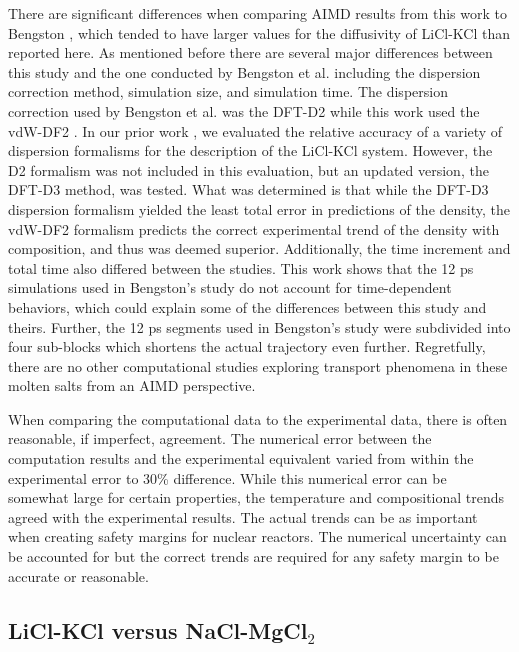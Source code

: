 \documentclass[review]{elsarticle}
\begin{document}
There are significant differences when comparing AIMD results from this work to Bengston \cite{Bengston2014}, which tended to have larger values for the diffusivity of LiCl-KCl than reported here. As mentioned before there are several major differences between this study and the one conducted by Bengston et al. \cite{Bengston2014} including the dispersion correction method, simulation size, and simulation time. The dispersion correction used by Bengston et al. was the DFT-D2\cite{grimme} while this work used the vdW-DF2 \cite{Dion2004}. In our prior work \cite{duemmler_liclkcl}, we evaluated the relative accuracy of a variety of dispersion formalisms for the description of the LiCl-KCl system. However, the D2 formalism was not included in this evaluation, but an updated version, the DFT-D3 method, was tested. What was determined is that while the DFT-D3 dispersion formalism yielded the least total error in predictions of the density, the vdW-DF2 formalism predicts the correct experimental trend of the density with composition, and thus was deemed superior. Additionally, the time increment and total time also differed between the studies. This work shows that the 12 ps simulations used in Bengston's study do not account for time-dependent behaviors, which could explain some of the differences between this study and theirs. Further, the 12 ps segments used in Bengston's study were subdivided into four sub-blocks which shortens the actual trajectory even further. Regretfully, there are no other computational studies exploring transport phenomena in these molten salts from an AIMD perspective.

When comparing the computational data to the experimental data, there is often reasonable, if imperfect, agreement. The numerical error between the computation results and the experimental equivalent varied from within the experimental error to 30\% difference. While this numerical error can be somewhat large for certain properties, the temperature and compositional trends agreed with the experimental results. The actual trends can be as important when creating safety margins for nuclear reactors. The numerical uncertainty can be accounted for but the correct trends are required for any safety margin to be accurate or reasonable.

\subsection{LiCl-KCl versus NaCl-MgCl$_2$}
\end{document}
